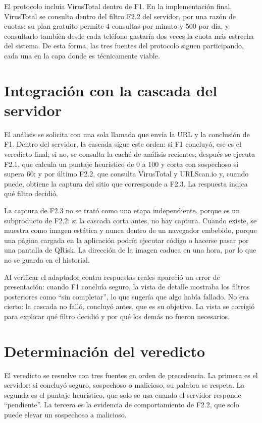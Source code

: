 El protocolo incluía VirusTotal dentro de F1. En la implementación final, VirusTotal se consulta dentro del filtro F2.2 del servidor, por una razón de cuotas: su plan gratuito permite 4 consultas por minuto y 500 por día, y consultarlo también desde cada teléfono gastaría dos veces la cuota más estrecha del sistema. De esta forma, las tres fuentes del protocolo siguen participando, cada una en la capa donde es técnicamente viable.

\section{Integración con la cascada del servidor}

El análisis se solicita con una sola llamada que envía la URL y la conclusión de F1. Dentro del servidor, la cascada sigue este orden: si F1 concluyó, ese es el veredicto final; si no, se consulta la caché de análisis recientes; después se ejecuta F2.1, que calcula un puntaje heurístico de 0 a 100 y corta con sospechoso si supera 60; y por último F2.2, que consulta VirusTotal y URLScan.io y, cuando puede, obtiene la captura del sitio que corresponde a F2.3. La respuesta indica qué filtro decidió.

La captura de F2.3 no se trató como una etapa independiente, porque es un subproducto de F2.2: si la cascada corta antes, no hay captura. Cuando existe, se muestra como imagen estática y nunca dentro de un navegador embebido, porque una página cargada en la aplicación podría ejecutar código o hacerse pasar por una pantalla de QRisk. La dirección de la imagen caduca en una hora, por lo que no se guarda en el historial.

Al verificar el adaptador contra respuestas reales apareció un error de presentación: cuando F1 concluía seguro, la vista de detalle mostraba los filtros posteriores como ``sin completar'', lo que sugería que algo había fallado. No era cierto: la cascada no falló, concluyó antes, que es su objetivo. La vista se corrigió para explicar qué filtro decidió y por qué los demás no fueron necesarios.

\section{Determinación del veredicto}

El veredicto se resuelve con tres fuentes en orden de precedencia. La primera es el servidor: si concluyó seguro, sospechoso o malicioso, su palabra se respeta. La segunda es el puntaje heurístico, que solo se usa cuando el servidor responde ``pendiente''. La tercera es la evidencia de comportamiento de F2.2, que solo puede elevar un sospechoso a malicioso.

